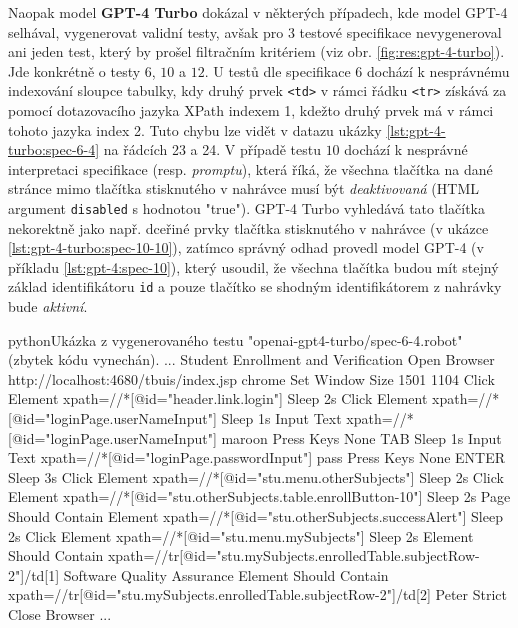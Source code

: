 \documentclass[czech, ma, kiv, he, iso690alph, pdf, viewonly]{fasthesis}
\begin{document}
            Naopak model \textbf{GPT-4 Turbo} dokázal v některých případech, kde model GPT-4 selhával, vygenerovat validní testy, avšak pro 3 testové specifikace nevygeneroval ani jeden test, který by prošel filtračním kritériem (viz obr. \ref{fig:res:gpt-4-turbo}). Jde konkrétně o testy \(6\), \(10\) a \(12\). U testů dle specifikace \(6\) dochází k nesprávnému indexování sloupce tabulky, kdy druhý prvek \verb|<td>| v rámci řádku \verb|<tr>| získává za pomocí dotazovacího jazyka XPath indexem 1, kdežto druhý prvek má v rámci tohoto jazyka index 2. Tuto chybu lze vidět v datazu ukázky \ref{lst:gpt-4-turbo:spec-6-4} na řádcích 23 a 24. V případě testu \(10\) dochází k nesprávné interpretaci specifikace (resp. \emph{promptu}), která říká, že všechna tlačítka na dané stránce mimo tlačítka stisknutého v nahrávce musí být \textit{deaktivovaná} (HTML argument \verb|disabled| s hodnotou "true"). GPT-4 Turbo vyhledává tato tlačítka nekorektně jako např. dceřiné prvky tlačítka stisknutého v nahrávce (v ukázce \ref{lst:gpt-4-turbo:spec-10-10}), zatímco správný odhad provedl model GPT-4 (v příkladu \ref{lst:gpt-4:spec-10}), který usoudil, že všechna tlačítka budou mít stejný základ identifikátoru \verb|id| a pouze tlačítko se shodným identifikátorem z nahrávky bude \textit{aktivní}.

            \begin{code}{python}{Ukázka z vygenerovaného testu "openai-gpt4-turbo/spec-6-4.robot" (zbytek kódu vynechán). \label{lst:gpt-4-turbo:spec-6-4}}
...
Student Enrollment and Verification
    Open Browser    http://localhost:4680/tbuis/index.jsp    chrome
    Set Window Size    1501    1104
    Click Element    xpath=//*[@id="header.link.login"]
    Sleep    2s
    Click Element    xpath=//*[@id="loginPage.userNameInput"]
    Sleep    1s
    Input Text    xpath=//*[@id="loginPage.userNameInput"]    maroon
    Press Keys    None    TAB
    Sleep    1s
    Input Text    xpath=//*[@id="loginPage.passwordInput"]    pass
    Press Keys    None    ENTER
    Sleep    3s
    Click Element    xpath=//*[@id="stu.menu.otherSubjects"]
    Sleep    2s
    Click Element    xpath=//*[@id="stu.otherSubjects.table.enrollButton-10"]
    Sleep    2s
    Page Should Contain Element    xpath=//*[@id="stu.otherSubjects.successAlert"]
    Sleep    2s
    Click Element    xpath=//*[@id="stu.menu.mySubjects"]
    Sleep    2s
    Element Should Contain    xpath=//tr[@id="stu.mySubjects.enrolledTable.subjectRow-2"]/td[1]    Software Quality Assurance
    Element Should Contain    xpath=//tr[@id="stu.mySubjects.enrolledTable.subjectRow-2"]/td[2]    Peter Strict
    Close Browser
...
            \end{code}
\end{document}
